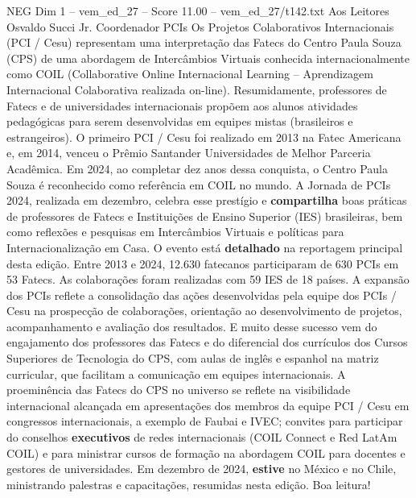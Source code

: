 \begin{textsample}{NEG Dim 1 – vem\_ed\_27 – Score 11.00 – vem\_ed\_27/t142.txt}  \label{ex:f1_neg_171}
Aos Leitores Osvaldo Succi Jr.
Coordenador PCIs Os Projetos Colaborativos Internacionais (PCI / Cesu) representam uma interpretação das Fatecs do Centro Paula Souza (CPS) de uma abordagem de Intercâmbios Virtuais conhecida internacionalmente como COIL (Collaborative Online Internacional Learning – Aprendizagem Internacional Colaborativa realizada on-line).
Resumidamente, professores de Fatecs e de universidades internacionais propõem aos alunos atividades pedagógicas para serem desenvolvidas em equipes mistas (brasileiros e estrangeiros).
O primeiro PCI / Cesu foi realizado em 2013 na Fatec Americana e, em 2014, venceu o Prêmio Santander Universidades de Melhor Parceria Acadêmica.
Em 2024, ao completar dez anos dessa conquista, o Centro Paula Souza é reconhecido como referência em COIL no mundo.
A Jornada de PCIs 2024, realizada em dezembro, celebra esse prestígio e \textbf{compartilha} boas práticas de professores de Fatecs e Instituições de Ensino Superior (IES) brasileiras, bem como reflexões e pesquisas em Intercâmbios Virtuais e políticas para Internacionalização em Casa.
O evento está \textbf{detalhado} na reportagem principal desta edição.
Entre 2013 e 2024, 12.630 fatecanos participaram de 630 PCIs em 53 Fatecs.
As colaborações foram realizadas com 59 IES de 18 países.
A expansão dos PCIs reflete a consolidação das ações desenvolvidas pela equipe dos PCIs / Cesu na prospecção de colaborações, orientação ao desenvolvimento de projetos, acompanhamento e avaliação dos resultados.
E muito desse sucesso vem do engajamento dos professores das Fatecs e do diferencial dos currículos dos Cursos Superiores de Tecnologia do CPS, com aulas de inglês e espanhol na matriz curricular, que facilitam a comunicação em equipes internacionais.
A proeminência das Fatecs do CPS no universo se reflete na visibilidade internacional alcançada em apresentações dos membros da equipe PCI / Cesu em congressos internacionais, a exemplo de Faubai e IVEC; convites para participar do conselhos \textbf{executivos} de redes internacionais (COIL Connect e Red LatAm COIL) e para ministrar cursos de formação na abordagem COIL para docentes e gestores de universidades.
Em dezembro de 2024, \textbf{estive} no México e no Chile, ministrando palestras e capacitações, resumidas nesta edição.
Boa leitura!

\end{textsample}
